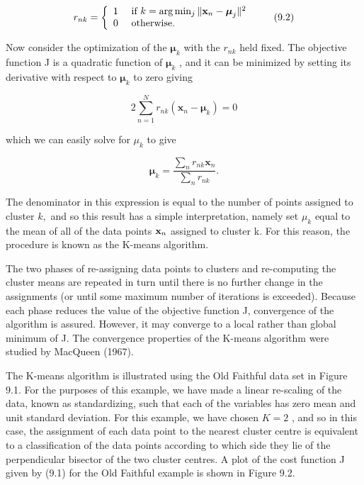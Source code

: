 \documentclass[
  10
]{article}
\begin{document}
\[
r _ {n k} = \left\{ \begin{array}{l l} 1 & \text { if } k = \arg \min _ {j} \| \mathbf {x} _ {n} - \boldsymbol {\mu} _ {j} \| ^ {2} \\ 0 & \text { otherwise. } \end{array} \right.\tag{9.2}
\]

Now consider the optimization of the \(\pmb { \mu } _ { k }\) with the
\(r _ { n k }\) held fixed. The objective function J is a quadratic
function of \(\pmb { \mu } _ { k }\) , and it can be minimized by
setting its derivative with respect to \(\pmb { \mu } _ { k }\) to zero
giving

\[
2 \sum_ {n = 1} ^ {N} r _ {n k} (\mathbf {x} _ {n} - \boldsymbol {\mu} _ {k}) = 0\tag{9.3}
\]

which we can easily solve for \(\mu _ { k }\) to give

\[
\pmb {\mu} _ {k} = \frac {\sum_ {n} r _ {n k} \mathbf {x} _ {n}}{\sum_ {n} r _ {n k}}.\tag{9.4}
\]

The denominator in this expression is equal to the number of points
assigned to cluster \(k ,\) and so this result has a simple
interpretation, namely set \(\mu _ { k }\) equal to the mean of all of
the data points \({ \bf x } _ { n }\) assigned to cluster k. For this
reason, the procedure is known as the K-means algorithm.

The two phases of re-assigning data points to clusters and re-computing
the cluster means are repeated in turn until there is no further change
in the assignments (or until some maximum number of iterations is
exceeded). Because each phase reduces the value of the objective
function J, convergence of the algorithm is assured. However, it may
converge to a local rather than global minimum of J. The convergence
properties of the K-means algorithm were studied by MacQueen (1967).

The K-means algorithm is illustrated using the Old Faithful data set in
Figure 9.1. For the purposes of this example, we have made a linear
re-scaling of the data, known as standardizing, such that each of the
variables has zero mean and unit standard deviation. For this example,
we have chosen \(K = 2\) , and so in this case, the assignment of each
data point to the nearest cluster centre is equivalent to a
classification of the data points according to which side they lie of
the perpendicular bisector of the two cluster centres. A plot of the
cost function J given by (9.1) for the Old Faithful example is shown in
Figure 9.2.
\end{document}
